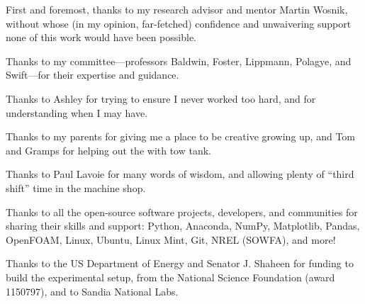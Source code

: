 



\begin{Acknowledgments}
\setlength{\baselineskip}{1.5\baselineskip}
{

    First and foremost, thanks to my research advisor and mentor Martin Wosnik,
    without whose (in my opinion, far-fetched) confidence and unwaivering
    support none of this work would have been possible.

    Thanks to my committee---professors Baldwin, Foster, Lippmann, Polagye, and
    Swift---for their expertise and guidance.

    Thanks to Ashley for trying to ensure I never worked too hard, and for
    understanding when I may have.

    Thanks to my parents for giving me a place to be creative growing up, and
    Tom and Gramps for helping out the with tow tank.

    Thanks to Paul Lavoie for many words of wisdom, and allowing plenty of
    ``third shift'' time in the machine shop.

    Thanks to all the open-source software projects, developers, and communities
    for sharing their skills and support: Python, Anaconda, NumPy, Matplotlib,
    Pandas, OpenFOAM, Linux, Ubuntu, Linux Mint, Git, NREL (SOWFA), and more!

    Thanks to the US Department of Energy and Senator J. Shaheen for funding to
    build the experimental setup, from the National Science Foundation (award
    1150797), and to Sandia National Labs.


}
\end{Acknowledgments}
